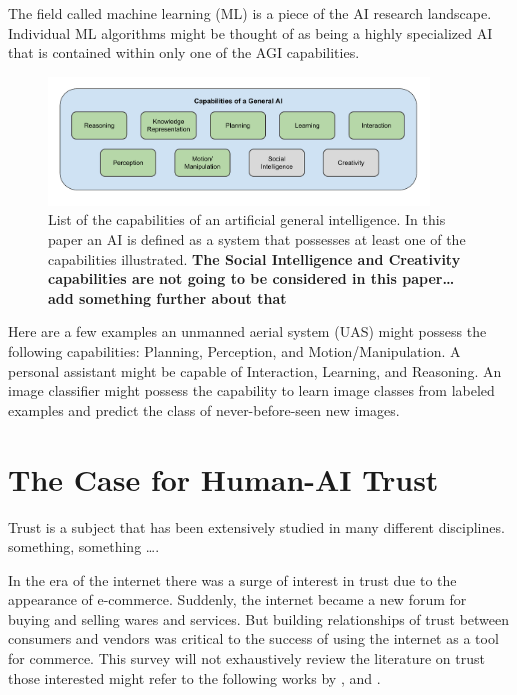     The field called machine learning (ML) is a piece of the AI research landscape. Individual ML algorithms might be thought of as being a highly specialized AI that is contained within only one of the AGI capabilities.

	\begin{figure}[htbp]
    	\centering
     	\includegraphics[width=0.9\textwidth]{Figures/AI_capabilities}
    	\caption{List of the capabilities of an artificial general intelligence. In this paper an AI is defined as a system that possesses at least one of the capabilities illustrated. \textbf{The Social Intelligence and Creativity capabilities are not going to be considered in this paper\ldots add something further about that}}
        \label{fig:AIcapabilities}
    \end{figure}

    Here are a few examples an unmanned aerial system (UAS) might possess the following capabilities: Planning, Perception,  and Motion/Manipulation. A personal assistant might be capable of Interaction, Learning, and Reasoning. An image classifier might possess the capability to learn image classes from labeled examples and predict the class of never-before-seen new images.
    

\section{The Case for Human-AI Trust}
    Trust is a subject that has been extensively studied in many different disciplines. something, something \ldots.

    In the era of the internet there was a surge of interest in trust due to the appearance of e-commerce. Suddenly, the internet became a new forum for buying and selling wares and services. But building relationships of trust between consumers and vendors was critical to the success of using the internet as a tool for commerce. This survey will not exhaustively review the literature on trust those interested might refer to the following works by \citet{McKnight2001-fa}, and \citet{Lewicki2006-hj}.

